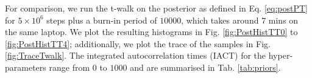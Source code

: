 For comparison, we run the t-walk on the posterior as defined in Eq. \ref{eq:postPT} for $5 \times 10^6$ steps plus a burn-in period of $10000$, which takes around $7$ mins on the same laptop.
We plot the resulting histograms in Fig. \ref{fig:PostHistTT0} to \ref{fig:PostHistTT4}; additionally, we plot the trace of the samples in Fig. \ref{fig:TraceTwalk}.
The integrated autocorrelation times (IACT) for the hyper-parameters range from $0$ to $1000$ and are summarised in Tab. \ref{tab:priors}.
%		
%		
%		
%		
%		
%		
%		
